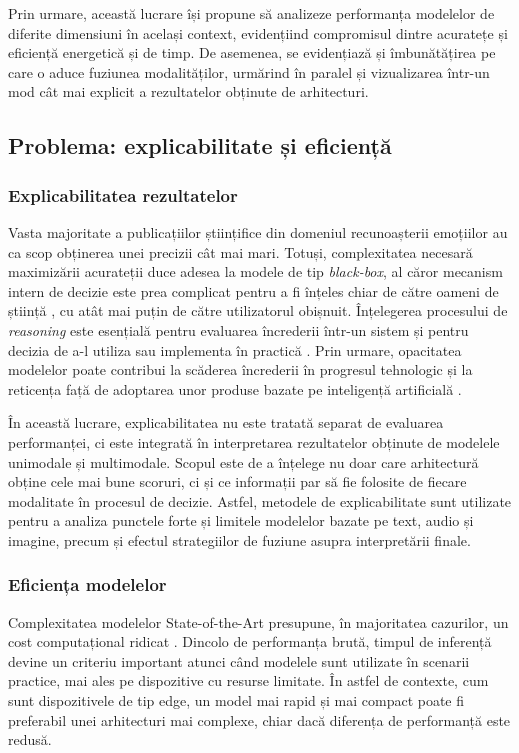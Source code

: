 \documentclass[12pt, a4paper]{article}
\begin{document}
Prin urmare, această lucrare își propune să analizeze performanța modelelor de diferite dimensiuni în același context, evidențiind compromisul dintre acuratețe și eficiență energetică și de timp. De asemenea, se evidențiază și îmbunătățirea pe care o aduce fuziunea modalităților, urmărind în paralel și vizualizarea într-un mod cât mai explicit a rezultatelor obținute de arhitecturi.


\subsection{Problema: explicabilitate și eficiență}

\subsubsection{Explicabilitatea rezultatelor}
Vasta majoritate a publicațiilor științifice din domeniul recunoașterii emoțiilor au ca scop obținerea unei precizii cât mai mari. Totuși, complexitatea necesară maximizării acurateții duce adesea la modele de tip \textit{black-box}, al căror mecanism intern de decizie este prea complicat pentru a fi înțeles chiar de către oameni de știință \cite{guidotti2018survey,adadi2018peeking}, cu atât mai puțin de către utilizatorul obișnuit. Înțelegerea procesului de \textit{reasoning} este esențială pentru evaluarea încrederii într-un sistem și pentru decizia de a-l utiliza sau implementa în practică \cite{ribeiro2016trust}. Prin urmare, opacitatea modelelor poate contribui la scăderea încrederii în progresul tehnologic și la reticența față de adoptarea unor produse bazate pe inteligență artificială \cite{adadi2018peeking}.

În această lucrare, explicabilitatea nu este tratată separat de evaluarea performanței, ci este integrată în interpretarea rezultatelor obținute de modelele unimodale și multimodale. Scopul este de a înțelege nu doar care arhitectură obține cele mai bune scoruri, ci și ce informații par să fie folosite de fiecare modalitate în procesul de decizie. Astfel, metodele de explicabilitate sunt utilizate pentru a analiza punctele forte și limitele modelelor bazate pe text, audio și imagine, precum și efectul strategiilor de fuziune asupra interpretării finale.

\subsubsection{Eficiența modelelor}
Complexitatea modelelor State-of-the-Art presupune, în majoritatea cazurilor, un cost computațional ridicat \cite{strubell-etal-2019-energy}. Dincolo de performanța brută, timpul de inferență devine un criteriu important atunci când modelele sunt utilizate în scenarii practice, mai ales pe dispozitive cu resurse limitate. În astfel de contexte, cum sunt dispozitivele de tip edge, un model mai rapid și mai compact poate fi preferabil unei arhitecturi mai complexe, chiar dacă diferența de performanță este redusă.
\end{document}
